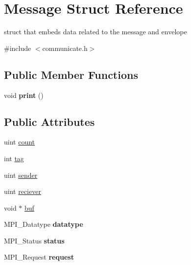 \hypertarget{structMessage}{}\section{Message Struct Reference}
\label{structMessage}


struct that embeds data related to the message and envelope  




{\ttfamily \#include $<$communicate.\+h$>$}

\subsection*{Public Member Functions}
\begin{DoxyCompactItemize}
\item 
\mbox{\label{structMessage_a9d9fb4752c49738110413a6c2c02ab2d}} 
void {\bfseries print} ()
\end{DoxyCompactItemize}
\subsection*{Public Attributes}
\begin{DoxyCompactItemize}
\item 
uint \mbox{\hyperlink{structMessage_a66dd9a1c2793e7f4f5718b40eaa8f99a}{count}}
\item 
int \mbox{\hyperlink{structMessage_ab84b0b508c7dd4e3852ea4f12b4afe07}{tag}}
\item 
uint \mbox{\hyperlink{structMessage_a377ce65ee6a414cb9ff14c344b34eda7}{sender}}
\item 
uint \mbox{\hyperlink{structMessage_a294808f8950df933fc36bf178f0b0608}{reciever}}
\item 
void $\ast$ \mbox{\hyperlink{structMessage_abb937f76a19076be9c3ba4349db00707}{buf}}
\item 
\mbox{\label{structMessage_a5b21bf981f0142f06d9b3193d1505057}} 
M\+P\+I\+\_\+\+Datatype {\bfseries datatype}
\item 
\mbox{\label{structMessage_a45010e58ede78479ac2d94b99573cd2f}} 
M\+P\+I\+\_\+\+Status {\bfseries status}
\item 
\mbox{\label{structMessage_a05ea0926cf9173c46d2284492530095a}} 
M\+P\+I\+\_\+\+Request {\bfseries request}
\end{DoxyCompactItemize}


